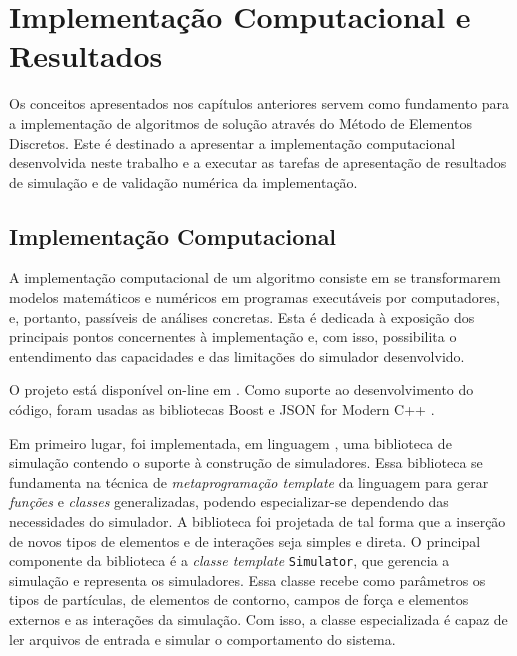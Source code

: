 \chapter{Implementação Computacional e Resultados} \label{ch:results}

Os conceitos apresentados nos capítulos anteriores servem como fundamento para a implementação de algoritmos de solução através do Método de Elementos Discretos. Este  é destinado a apresentar a implementação computacional desenvolvida neste trabalho e a executar as tarefas de apresentação de resultados de simulação e de validação numérica da implementação.

\section{Implementação Computacional} \label{sec:computational_implementation}

A implementação computacional de um algoritmo consiste em se transformarem modelos matemáticos e numéricos em programas executáveis por computadores, e, portanto, passíveis de análises concretas. Esta  é dedicada à exposição dos principais pontos concernentes à implementação e, com isso, possibilita o entendimento das capacidades e das limitações do simulador desenvolvido.

O projeto está disponível on-line em . Como suporte ao desenvolvimento do código, foram usadas as bibliotecas Boost \cite{bib:boost} e JSON for Modern C++ \cite{bib:nlohmann}.

Em primeiro lugar, foi implementada, em linguagem \CPP{}, uma biblioteca de simulação contendo o suporte à construção de simuladores. Essa biblioteca se fundamenta na técnica de \textit{metaprogramação template} da linguagem para gerar \textit{funções} e \textit{classes} generalizadas, podendo especializar-se dependendo das necessidades do simulador. A biblioteca foi projetada de tal forma que a inserção de novos tipos de elementos e de interações seja simples e direta. O principal componente da biblioteca é a \textit{classe template} \lstinline[style=Inline C++]{Simulator}, que gerencia a simulação e representa os simuladores. Essa classe recebe como parâmetros os tipos de partículas, de elementos de contorno, campos de força e elementos externos e as interações da simulação. Com isso, a classe especializada é capaz de ler arquivos de entrada e simular o comportamento do sistema.


